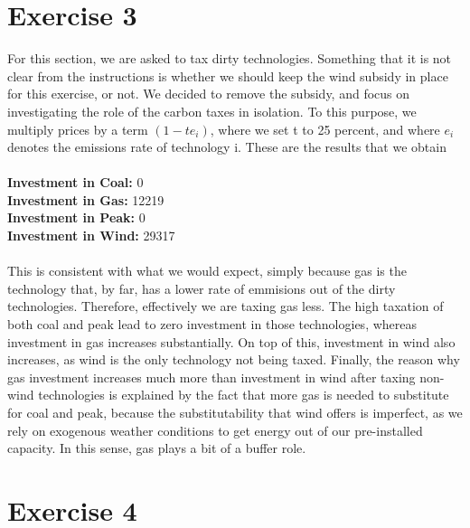 \documentclass[12 pt]{article}
\begin{document}
\section*{Exercise 3}

For this section, we are asked to tax dirty technologies. Something that it is not clear from the instructions is whether we should keep the wind subsidy in place for this exercise, or not. We decided to remove the subsidy, and focus on investigating the role of the carbon taxes in isolation. To this purpose, we  multiply prices by a term $(1-te_i)$, where we set t to 25 percent, and where $e_i$ denotes the emissions rate of technology i.	These are the results that we obtain\\
\\
\textbf{Investment in Coal:} 0 \\
\textbf{Investment in Gas:}  12219  \\
\textbf{Investment in Peak:} 0 \\
\textbf{Investment in Wind:} 29317 \\
\\

This is consistent with what we would expect, simply because gas is the technology that, by far, has a lower rate of emmisions out of the dirty technologies. Therefore, effectively we are taxing gas less. The high taxation of both coal and peak lead to zero investment in those technologies, whereas investment in gas increases substantially. On top of this, investment in wind also increases, as wind is the only technology not being taxed. Finally, the reason why gas investment increases much more than investment in wind after taxing non-wind technologies is explained by the fact that more gas is needed to substitute for coal and peak, because the substitutability that wind offers is imperfect, as we rely on exogenous weather conditions to get energy out of our pre-installed capacity. In this sense, gas plays a bit of a buffer role.

\section*{Exercise 4}
\end{document}
